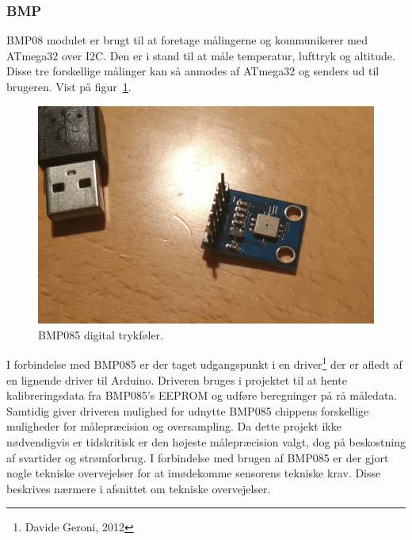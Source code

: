 \subsubsection{BMP}
BMP08 modulet er brugt til at foretage målingerne og kommunikerer med ATmega32 over I2C. Den er i stand til at måle temperatur, lufttryk og altitude. 
Disse tre forskellige målinger kan så anmodes af ATmega32 og senders ud til brugeren. Vist på figur~\ref{fig:devicebmp}.

\begin{figure}[h]
	\centering
	\includegraphics[width=0.7\linewidth]{figs/device_bmp.jpg}
	\caption{BMP085 digital trykføler.}
	\label{fig:devicebmp}
\end{figure}

I forbindelse med BMP085 er der taget udgangspunkt i en driver\footnote{Davide Geroni, 2012} der er afledt af en lignende driver til Arduino.
Driveren bruges i projektet til at hente kalibreringsdata fra BMP085's EEPROM og udføre beregninger på rå måledata. Samtidig giver driveren 
mulighed for udnytte BMP085 chippens forskellige muligheder for målepræcision og oversampling. Da dette projekt ikke nødvendigvis er tidskritisk er 
den højeste målepræcision valgt, dog på beskostning af svartider og strømforbrug.
I forbindelse med brugen af BMP085 er der gjort nogle tekniske overvejelser for at imødekomme sensorens tekniske krav. Disse beskrives nærmere i afsnittet om tekniske overvejelser.
